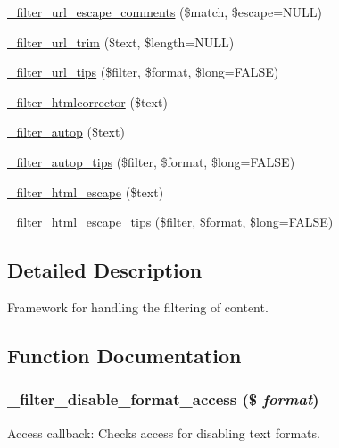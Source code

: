 \begin{DoxyCompactItemize}
\item 
\hyperlink{group__standard__filters_ga3812d3d44a81e993385890149dc186be}{\_\-filter\_\-url\_\-escape\_\-comments} (\$match, \$escape=NULL)
\item 
\hyperlink{group__standard__filters_gae320ec54b6c197f3263c2d54a4477e55}{\_\-filter\_\-url\_\-trim} (\$text, \$length=NULL)
\item 
\hyperlink{group__standard__filters_ga7f7a390abfeefdfc03ad377037edfb18}{\_\-filter\_\-url\_\-tips} (\$filter, \$format, \$long=FALSE)
\item 
\hyperlink{group__standard__filters_ga3cb6607b3259ac8f9a83f317a63e3ec6}{\_\-filter\_\-htmlcorrector} (\$text)
\item 
\hyperlink{group__standard__filters_ga1dc1e116a15318077568b27534bd41bc}{\_\-filter\_\-autop} (\$text)
\item 
\hyperlink{group__standard__filters_ga21d7f6735341cc56c6e82dfe1d94eaf3}{\_\-filter\_\-autop\_\-tips} (\$filter, \$format, \$long=FALSE)
\item 
\hyperlink{group__standard__filters_ga5ea934ce6b9314fdb97a572fa3530631}{\_\-filter\_\-html\_\-escape} (\$text)
\item 
\hyperlink{group__standard__filters_gaea4abc943473d502360f1448bf66b1a2}{\_\-filter\_\-html\_\-escape\_\-tips} (\$filter, \$format, \$long=FALSE)
\end{DoxyCompactItemize}


\subsection{Detailed Description}
Framework for handling the filtering of content. 

\subsection{Function Documentation}
\hypertarget{filter_8module_a22551a22d0b2436acc928c4f9832e616}{
\subsubsection[{\_\-filter\_\-disable\_\-format\_\-access}]{\setlength{\rightskip}{0pt plus 5cm}\_\-filter\_\-disable\_\-format\_\-access (\$ {\em format})}}
\label{filter_8module_a22551a22d0b2436acc928c4f9832e616}
Access callback: Checks access for disabling text formats.


